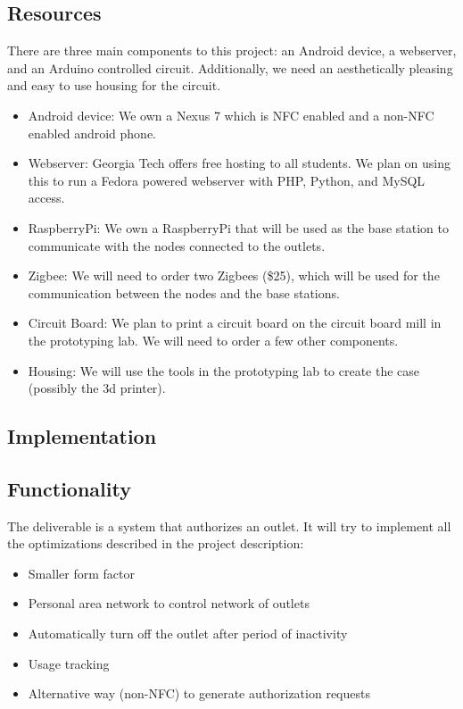 \documentclass{sigchi}
\begin{document}
\subsection {Resources}
There are three main components to this project: an Android device, a webserver, and an Arduino controlled circuit. Additionally, we need an aesthetically pleasing and easy to use housing for the circuit.
\begin{itemize}
\item Android device: We own a Nexus 7 which is NFC enabled and a non-NFC enabled android phone.
\item Webserver: Georgia Tech offers free hosting to all students. We plan on using this to run a Fedora powered webserver with PHP, Python, and MySQL access.
\item RaspberryPi: We own a RaspberryPi that will be used as the base station to communicate with the nodes connected to the outlets.
\item Zigbee: We will need to order two Zigbees (\$25), which will be used for the communication between the nodes and the base stations.
\item Circuit Board: We plan to print a circuit board on the circuit board mill in the prototyping lab. We will need to order a few other components.
\item Housing: We will use the tools in the prototyping lab to create the case (possibly the 3d printer).
\end{itemize}

\subsection{Implementation}



\subsection {Functionality}
The deliverable is a system that authorizes an outlet. It will try to implement all the optimizations described in the project description:
\begin{itemize}
\item Smaller form factor 
\item Personal area network to control network of outlets
\item Automatically turn off the outlet after period of inactivity
\item Usage tracking
\item Alternative way (non-NFC) to generate authorization requests
\end{itemize}
\end{document}
